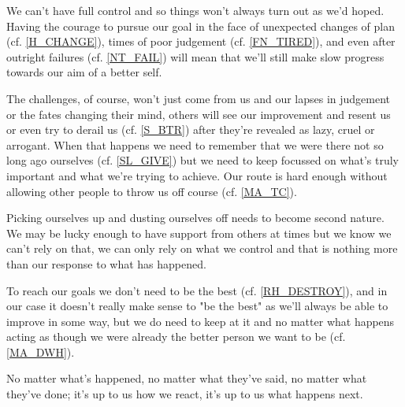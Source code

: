 \cleardoublepage
\begin{multicols}{2}

We can't have full control and so things won't always turn out as we'd hoped. Having the courage to pursue our goal in the face of unexpected changes of plan (cf. \ref{H_CHANGE}), times of poor judgement (cf. \ref{FN_TIRED}), and even after outright failures (cf. \ref{NT_FAIL}) will mean that we'll still make slow progress towards our aim of a better self. 

The challenges, of course, won't just come from us and our lapses in judgement or the fates changing their mind, others will see our improvement and resent us or even try to derail us (cf. \ref{S_BTR}) after they're revealed as lazy, cruel or arrogant. When that happens we need to remember that we were there not so long ago ourselves (cf. \ref{SL_GIVE}) but we need to keep focussed on what's truly important and what we're trying to achieve. Our route is hard enough without allowing other people to throw us off course (cf. \ref{MA_TC}).

Picking ourselves up and dusting ourselves off needs to become second nature. We may be lucky enough to have support from others at times but we know we can't rely on that, we can only rely on what we control and that is nothing more than our response to what has happened.

To reach our goals we don't need to be the best (cf. \ref{RH_DESTROY}), and in our case it doesn't really make sense to "be the best" as we'll always be able to improve in some way, but we do need to keep at it and no matter what happens acting as though we were already the better person we want to be (cf. \ref{MA_DWH}).

No matter what's happened, no matter what they've said, no matter what they've done; it's up to us how we react, it's up to us what happens next.

\end{multicols}
\clearpage

